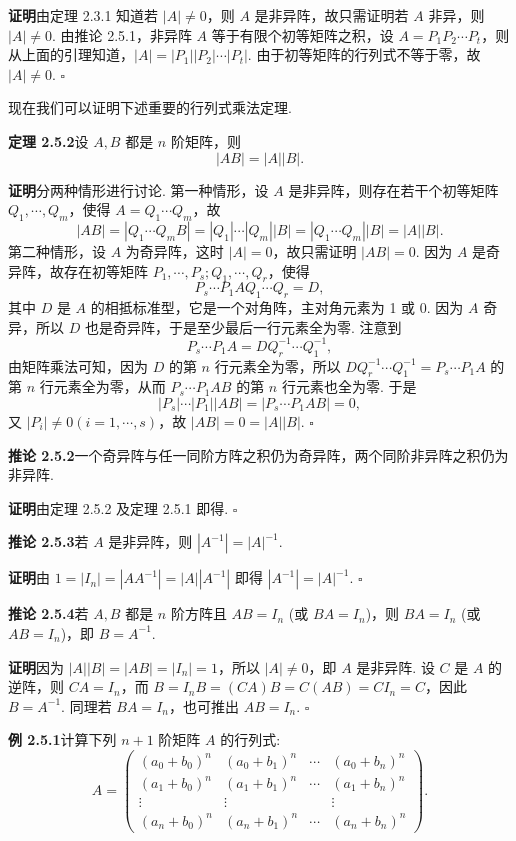 \documentclass[UTF8,12pt,a4paper,fontset=fandol]{ctexart}
\begin{document}
\noindent\textbf{证明}\quad 由定理 2.3.1 知道若 $|A|\ne 0$，则 $A$ 是非异阵，故只需证明若 $A$ 非异，则 $|A|\ne 0$. 由推论 2.5.1，非异阵 $A$ 等于有限个初等矩阵之积，设 $A=P_1P_2\cdots P_t$，则从上面的引理知道，$|A|=|P_1||P_2|\cdots |P_t|$. 由于初等矩阵的行列式不等于零，故 $|A|\ne 0$. $\square$

现在我们可以证明下述重要的行列式乘法定理.

\noindent\textbf{定理 2.5.2}\quad 设 $A,B$ 都是 $n$ 阶矩阵，则
\[
|AB|=|A||B|.
\]

\noindent\textbf{证明}\quad 分两种情形进行讨论. 第一种情形，设 $A$ 是非异阵，则存在若干个初等矩阵 $Q_1,\cdots,Q_m$，使得 $A=Q_1\cdots Q_m$，故
\[
|AB|=|Q_1\cdots Q_mB|=|Q_1|\cdots |Q_m||B|=|Q_1\cdots Q_m||B|=|A||B|.
\]
第二种情形，设 $A$ 为奇异阵，这时 $|A|=0$，故只需证明 $|AB|=0$. 因为 $A$ 是奇异阵，故存在初等矩阵 $P_1,\cdots,P_s;Q_1,\cdots,Q_r$，使得
\[
P_s\cdots P_1AQ_1\cdots Q_r=D,
\]
其中 $D$ 是 $A$ 的相抵标准型，它是一个对角阵，主对角元素为 1 或 0. 因为 $A$ 奇异，所以 $D$ 也是奇异阵，于是至少最后一行元素全为零. 注意到
\[
P_s\cdots P_1A=DQ_r^{-1}\cdots Q_1^{-1},
\]
由矩阵乘法可知，因为 $D$ 的第 $n$ 行元素全为零，所以 $DQ_r^{-1}\cdots Q_1^{-1}=P_s\cdots P_1A$ 的第 $n$ 行元素全为零，从而 $P_s\cdots P_1AB$ 的第 $n$ 行元素也全为零. 于是
\[
|P_s|\cdots |P_1||AB|=|P_s\cdots P_1AB|=0,
\]
又 $|P_i|\ne 0(i=1,\cdots,s)$，故 $|AB|=0=|A||B|$. $\square$

\noindent\textbf{推论 2.5.2}\quad 一个奇异阵与任一同阶方阵之积仍为奇异阵，两个同阶非异阵之积仍为非异阵.

\noindent\textbf{证明}\quad 由定理 2.5.2 及定理 2.5.1 即得. $\square$

\noindent\textbf{推论 2.5.3}\quad 若 $A$ 是非异阵，则 $|A^{-1}|=|A|^{-1}$.

\noindent\textbf{证明}\quad 由 $1=|I_n|=|AA^{-1}|=|A||A^{-1}|$ 即得 $|A^{-1}|=|A|^{-1}$. $\square$

\noindent\textbf{推论 2.5.4}\quad 若 $A,B$ 都是 $n$ 阶方阵且 $AB=I_n$ (或 $BA=I_n$)，则 $BA=I_n$ (或 $AB=I_n$)，即 $B=A^{-1}$.

\noindent\textbf{证明}\quad 因为 $|A||B|=|AB|=|I_n|=1$，所以 $|A|\ne 0$，即 $A$ 是非异阵. 设 $C$ 是 $A$ 的逆阵，则 $CA=I_n$，而 $B=I_nB=(CA)B=C(AB)=CI_n=C$，因此 $B=A^{-1}$. 同理若 $BA=I_n$，也可推出 $AB=I_n$. $\square$

\noindent\textbf{例 2.5.1}\quad 计算下列 $n+1$ 阶矩阵 $A$ 的行列式:
\[
A=\left(\begin{array}{cccc}
(a_0+b_0)^n & (a_0+b_1)^n & \cdots & (a_0+b_n)^n\\
(a_1+b_0)^n & (a_1+b_1)^n & \cdots & (a_1+b_n)^n\\
\vdots & \vdots & & \vdots\\
(a_n+b_0)^n & (a_n+b_1)^n & \cdots & (a_n+b_n)^n
\end{array}\right).
\]
\end{document}
